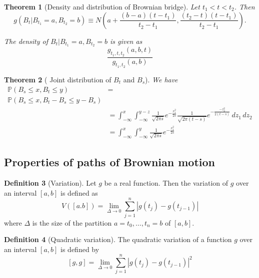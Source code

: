 \documentclass[10pt, oneside, reqno]{amsart}
\theoremstyle{plain}%
\newtheorem{thm}{Theorem}[section]
\theoremstyle{definition}
\newtheorem{defn}[thm]{Definition}
\theoremstyle{remark}
\renewcommand{\P}{\mathbb{P}}
\begin{document}
\begin{thm}[Density and distribution of Brownian bridge]
    Let $t_1  < t < t_2$.  Then \[
        g( B_t | B_{t_1} = a, B_{t_2} = b ) \equiv N\left(a + \frac{(b-a)(t-t_1)}{t_2 - t_1}, \frac{(t_2-t)(t-t_1)}{t_2 - t_1} \right).
    \]
    
    The density of $B_t | B_{t_1} =a , B_{t_2} = b$ is given as \[
        \frac{g_{t_1, t, t_2}(a,b,t)}{g_{t_1, t_2}(a,b)}
    \]
\end{thm}

\begin{thm}[ Joint distribution of $B_t$ and $B_s$]
    We have 
    \begin{align*}
        \P(B_s \leq x, B_t \leq y) &= \\ \P(B_s \leq x, B_{t} - B_s \leq y - B_s ) \\
        &= \int_{-\infty}^x \int_{-\infty}^{y-z} \frac{1}{\sqrt{2\pi s}} e^{-\frac{x_1^2}{2s}} \frac{1}{\sqrt{2 \pi (t-s)}} e^{-\frac{-z_2^2}{2(t-s)}} \, dz_1 \, dz_2 \\
        &= \int_{-\infty}^x \int_{-\infty}^y \frac{1}{\sqrt{2\pi s}} e^{-\frac{x_1^2}{2s}} 
    \end{align*}
\end{thm}

\subsection{Properties of paths of Brownian motion} %
\label{sub:properties_of_paths_of_brownian_motion}

\begin{defn}[Variation]
    Let $g$ be a real function.  Then the variation of $g$ over an interval $[a,b]$ is defined as \[
        V([a.b]) = \lim_{\Delta \rightarrow 0} \sum_{j = 1}^n | g(t_j) - g(t_{j-1}) |
    \] where $\Delta$ is the size of the partition $a = t_0, \dots, t_n = b$ of $[a,b]$.
\end{defn}

\begin{defn}[Quadratic variation]
    The quadratic variation of a function $g$ over an interval $[a,b]$ is defined by \[
        [g,g] = \lim_{\Delta \rightarrow 0} \sum_{j = 1}^n | g(t_j) - g(t_{j-1})|^2 \]
\end{defn}
\end{document}
